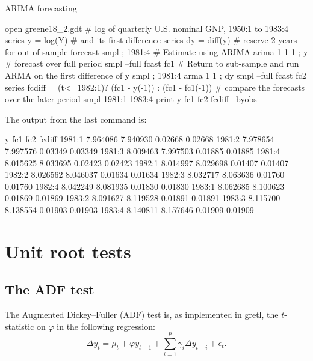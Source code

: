 \begin{script}[htbp]
  \caption{ARIMA forecasting}
  \label{arima-fcast-script}
\begin{scode}
open greene18_2.gdt
# log of quarterly U.S. nominal GNP, 1950:1 to 1983:4
series y = log(Y)
# and its first difference
series dy = diff(y)
# reserve 2 years for out-of-sample forecast
smpl ; 1981:4
# Estimate using ARIMA
arima 1 1 1 ; y 
# forecast over full period
smpl --full
fcast fc1
# Return to sub-sample and run ARMA on the first difference of y
smpl ; 1981:4
arma 1 1 ; dy
smpl --full
fcast fc2
series fcdiff = (t<=1982:1)? (fc1 - y(-1)) : (fc1 - fc1(-1))
# compare the forecasts over the later period
smpl 1981:1 1983:4
print y fc1 fc2 fcdiff --byobs
\end{scode}
The output from the last command is:
%
\begin{code}
                  y          fc1          fc2       fcdiff
1981:1      7.964086     7.940930      0.02668      0.02668
1981:2      7.978654     7.997576      0.03349      0.03349
1981:3      8.009463     7.997503      0.01885      0.01885
1981:4      8.015625     8.033695      0.02423      0.02423
1982:1      8.014997     8.029698      0.01407      0.01407
1982:2      8.026562     8.046037      0.01634      0.01634
1982:3      8.032717     8.063636      0.01760      0.01760
1982:4      8.042249     8.081935      0.01830      0.01830
1983:1      8.062685     8.100623      0.01869      0.01869
1983:2      8.091627     8.119528      0.01891      0.01891
1983:3      8.115700     8.138554      0.01903      0.01903
1983:4      8.140811     8.157646      0.01909      0.01909
\end{code}
\end{script}


\section{Unit root tests}
\label{sec:uroot}

\subsection{The ADF test}
\label{sec:ADFtest}

The Augmented Dickey--Fuller (ADF) test is, as implemented in
gretl, the $t$-statistic on $\varphi$ in the following regression:
\begin{equation}
  \label{eq:ADFtest}
  \Delta y_t = \mu_t + \varphi y_{t-1} + \sum_{i=1}^p \gamma_i \Delta
  y_{t-i} + \epsilon_t .
\end{equation}


